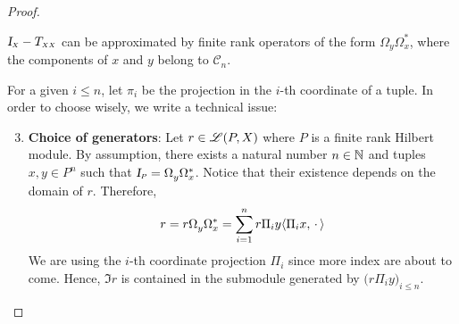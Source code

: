 \begin{lema}
\begin{proof}
\begin{itroman}
    \item \label{item: aproximacao de Id-T_XX} $\sub{\Id}{X}-\sub{T}{X X}$ can be approximated by finite rank operators of the form $\Omega_{y} \Omega_{x}^{*}$, where the components of $x$ and $y$ belong to ${\mathscr C}_n$.
\end{itroman}
For a given $i \leqslant n$, let $\pi_i$ be the projection in the $i$-th coordinate of a tuple. In order to choose wisely, we write a technical issue:
\begin{enumerate}[label=\ensuremath{(\roman*)}]
    \setcounter{enumi}{2}
    \item \textbf{Choice of generators}: Let $r\in \mathscr L(P,X)$ where $P$ is a finite rank Hilbert module. By assumption, there exists a natural number $n \in \operatorname{\mathbb{N}}$ and tuples $x, y \in P^{n}$ such that $\sub\Id{P} = \Omega^{\vphantom{*}}_{y} \Omega_{x}^*$. Notice that their existence depends on the domain of $r$.  Therefore,
\[
r = r\Omega^{\vphantom{*}}_{y} \Omega_{x}^* = \sum_{i=1}^{n} r\Pi_iy\langle {\Pi_ix},{\operatorname{\,\cdot\,}}\rangle
\]
    We are using the $i$-th coordinate projection $\Pi_i$ since more index are about to come. Hence, $\Im r$ is contained in the submodule generated by $\big(r\Pi_iy\big)_{i \leq n}$.
\end{enumerate}


\end{proof}
\end{lema}
